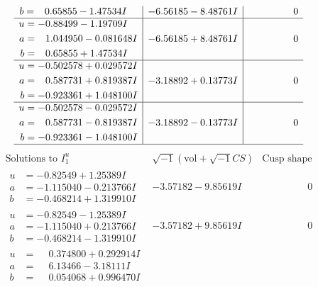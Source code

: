 \documentclass[1p]{elsarticle_modified}
\theoremstyle{definition}
\newcommand{\I}{\sqrt{-1}}
\begin{document}
$$\begin{array}{c|c|c}
\begin{aligned}
b &= \phantom{-}0.65855 - 1.47534 I\end{aligned}
 & -6.56185 - 8.48761 I & \phantom{-0.000000 } 0 \\ \hline\begin{aligned}
u &= -0.88499 - 1.19709 I \\
a &= \phantom{-}1.044950 - 0.081648 I \\
b &= \phantom{-}0.65855 + 1.47534 I\end{aligned}
 & -6.56185 + 8.48761 I & \phantom{-0.000000 } 0 \\ \hline\begin{aligned}
u &= -0.502578 + 0.029572 I \\
a &= \phantom{-}0.587731 + 0.819387 I \\
b &= -0.923361 + 1.048100 I\end{aligned}
 & -3.18892 + 0.13773 I & \phantom{-0.000000 } 0 \\ \hline\begin{aligned}
u &= -0.502578 - 0.029572 I \\
a &= \phantom{-}0.587731 - 0.819387 I \\
b &= -0.923361 - 1.048100 I\end{aligned}
 & -3.18892 - 0.13773 I & \phantom{-0.000000 } 0\\
 \hline 
 \end{array}$$\newpage$$\begin{array}{c|c|c}  
\text{Solutions to }I^u_{1}& \I (\text{vol} + \sqrt{-1}CS) & \text{Cusp shape}\\
 \hline 
\begin{aligned}
u &= -0.82549 + 1.25389 I \\
a &= -1.115040 - 0.213766 I \\
b &= -0.468214 + 1.319910 I\end{aligned}
 & -3.57182 - 9.85619 I & \phantom{-0.000000 } 0 \\ \hline\begin{aligned}
u &= -0.82549 - 1.25389 I \\
a &= -1.115040 + 0.213766 I \\
b &= -0.468214 - 1.319910 I\end{aligned}
 & -3.57182 + 9.85619 I & \phantom{-0.000000 } 0 \\ \hline\begin{aligned}
u &= \phantom{-}0.374800 + 0.292914 I \\
a &= \phantom{-}6.13466 - 3.18111 I \\
b &= \phantom{-}0.054068 + 0.996470 I\end{aligned}

\end{array}$$
\end{document}
